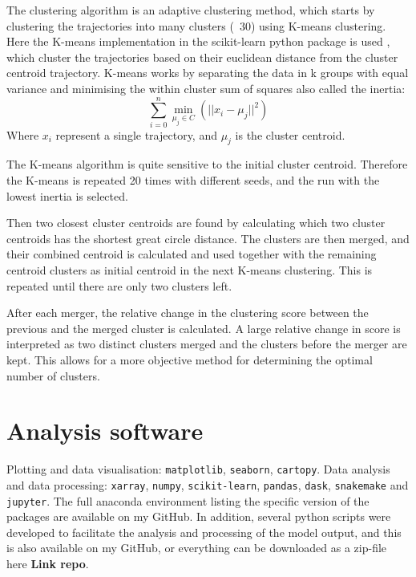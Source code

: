 The \textcite{dorling1992cluster} clustering algorithm is an adaptive clustering method, which starts by clustering the trajectories into many clusters (~30) using K-means clustering. Here the K-means implementation in the scikit-learn python package is used \parencite{scikit-learn}, which cluster the trajectories based on their euclidean distance from the cluster centroid trajectory. K-means works by separating the data in k groups with equal variance and minimising the within cluster sum of squares also called the inertia: 
\begin{equation}
    \sum_{i=0}^{n}\min_{\mu_j \in C}(||x_i - \mu_j||^2)
\end{equation}
Where $x_i$ represent a single trajectory, and $\mu_j$ is the cluster centroid. 

The K-means algorithm is quite sensitive to the initial cluster centroid. Therefore the K-means is repeated 20 times with different seeds, and the run with the lowest inertia is selected. 

Then two closest cluster centroids are found by calculating which two cluster centroids has the shortest great circle distance. The clusters are then merged, and their combined centroid is calculated and used together with the remaining centroid clusters as initial centroid in the next K-means clustering. This is repeated until there are only two clusters left. 

After each merger, the relative change in the clustering score between the previous and the merged cluster is calculated. A large relative change in score is interpreted as two distinct clusters merged and the clusters before the merger are kept. This allows for a more objective method for determining the optimal number of clusters.    

\chapter{Analysis software}\label{appendix:software}
Plotting and data visualisation:  \verb|matplotlib|, \verb|seaborn|, \verb|cartopy|. Data analysis and data processing: \verb|xarray|, \verb|numpy|, \verb|scikit-learn|, \verb|pandas|, \verb|dask|, \verb|snakemake| and \verb|jupyter|. The full anaconda environment listing the specific version of the packages are available on my GitHub. In addition, several python scripts were developed to facilitate the analysis and processing of the model output, and this is also available on my GitHub, or everything can be downloaded as a zip-file here \textbf{Link repo}. 
